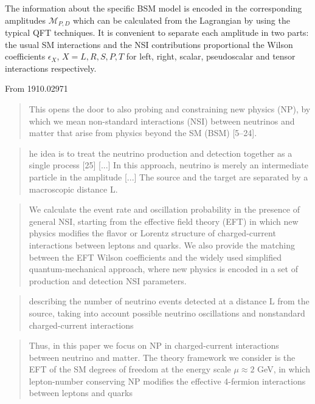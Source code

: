 \documentclass[a4paper,10pt,epsfig,epsf,amsfonts,amsmath]{article}
\begin{document}
The information about the specific BSM model is encoded in the corresponding  amplitudes $\mathcal{M}_{P,D}$ which can be calculated from the Lagrangian by using the typical QFT techniques. 
It is convenient to separate each amplitude in two parts: the usual SM interactions
and the NSI contributions proportional the Wilson coefficients $\epsilon_X$, $X=L,R,S,P,T$ for left, right, scalar, pseudoscalar and tensor interactions respectively. 

\begin{ideas}



From 1910.02971
\begin{quote}
    This opens the door to also probing and constraining new physics (NP), by which we
mean non-standard interactions (NSI) between neutrinos and matter that arise from physics
beyond the SM (BSM) [5–24]. 
\end{quote}
\begin{quote}
    he idea is to treat the neutrino production and detection together as a single process [25]
    [...]    
    In this approach,
neutrino is merely an intermediate particle in the amplitude [...]
The source and the target are separated by a macroscopic distance L.
\end{quote}
\begin{quote}
    We calculate the event rate and oscillation
probability in the presence of general NSI, starting from the effective field theory (EFT) in
which new physics modifies the flavor or Lorentz structure of charged-current interactions
between leptons and quarks. We also provide the matching between the EFT Wilson coefficients and the widely used simplified quantum-mechanical approach, where new physics
is encoded in a set of production and detection NSI parameters.
\end{quote}
\begin{quote}
    describing the number of neutrino
events detected at a distance L from the source, taking into account possible neutrino
oscillations and nonstandard charged-current interactions
\end{quote}
\begin{quote}
    Thus, in this paper we focus on NP in charged-current interactions between neutrino
and matter. The theory framework we consider is the EFT of the SM degrees of freedom at
the energy scale $\mu \approx 2$ GeV, in which lepton-number conserving NP modifies the effective
4-fermion interactions between leptons and quarks
\end{quote}


\end{ideas}
\end{document}
